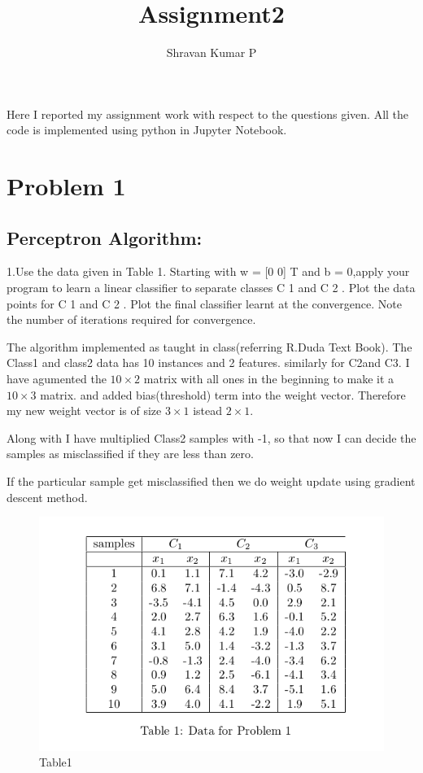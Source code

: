 \documentclass[10pt,a4paper]{article}
\author{Shravan Kumar P}
\title{Assignment2}
\begin{document}
\maketitle
Here I reported my assignment work with respect to the questions given. All the code is implemented using   python in Jupyter Notebook. 

\tableofcontents
\section{Problem 1}
\subsection{Perceptron Algorithm:}
1.Use the data given in Table 1. Starting with w = [0 0] T and b = 0,apply your program to learn a linear classifier to separate classes C 1 and C 2 . Plot the data points for C 1 and C 2 . Plot the final classifier learnt at the convergence. Note the number of iterations required for convergence.

The algorithm implemented as taught in class(referring R.Duda Text Book). 
The Class1 and class2 data has 10 instances and 2 features. similarly for C2and C3. 
I have agumented the $10\times2$ matrix with all ones in the beginning to make it a $10\times3$ matrix.
and added bias(threshold) term into the weight vector. Therefore my new weight vector is of size $3\times1$ istead $2\times1$. 

Along with I have multiplied Class2 samples with -1, so that now I can decide the samples as misclassified if they are less than zero. 

If the particular sample get misclassified then we do weight update using gradient descent method.

\graphicspath{ {/images/} }
\begin{figure}[h!]
\includegraphics[scale=0.5]{images/problem1T.png}
  \caption{Table1}
  \label{fig:dataT1}
\end{figure}
\vfill
\end{document}
